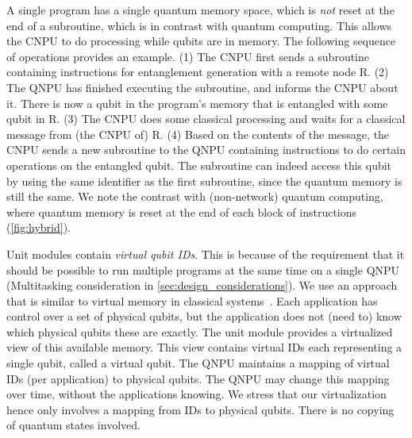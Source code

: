A single program has a single quantum memory space, which is \textit{not} reset at the end of a subroutine, which is in contrast with quantum computing.
This allows the \ac{CNPU} to do processing while qubits are in memory.
The following sequence of operations provides an example.
    (1) The \ac{CNPU} first sends a subroutine containing instructions for entanglement generation with a remote node R.
    (2) The \ac{QNPU} has finished executing the subroutine, and informs the \ac{CNPU} about it.
        There is now a qubit in the program's memory that is entangled with some qubit in R.
    (3) The \ac{CNPU} does some classical processing and waits for a classical message from (the \ac{CNPU} of) R.
    (4) Based on the contents of the message, the \ac{CNPU} sends a new subroutine to the \ac{QNPU} containing instructions to do certain operations on the entangled qubit.
        The subroutine can indeed access this qubit by using the same identifier as the first subroutine, since the quantum memory is still the same.
        We note the contrast with (non-network) quantum computing, where quantum memory is reset at the end of each block of instructions (\cref{fig:hybrid}).


Unit modules contain \textit{virtual qubit IDs}.
This is because of the requirement that it should be possible to run multiple programs at the same time on a single \ac{QNPU} (Multitasking consideration in \cref{sec:design_considerations}).
We use an approach that is similar to virtual memory in classical systems~\cite{arpaci2018operating}.
Each application has control over a set of physical qubits, but the application does not (need to) know which physical qubits these are exactly.
The unit module provides a virtualized view of this available memory.
This view contains virtual IDs each representing a single qubit, called a virtual qubit.
The \ac{QNPU} maintains a mapping of virtual IDs (per application) to physical qubits.
The \ac{QNPU} may change this mapping over time, without the applications knowing.
We stress that our virtualization hence only involves a mapping from IDs to physical qubits.
There is no copying of quantum states involved.

